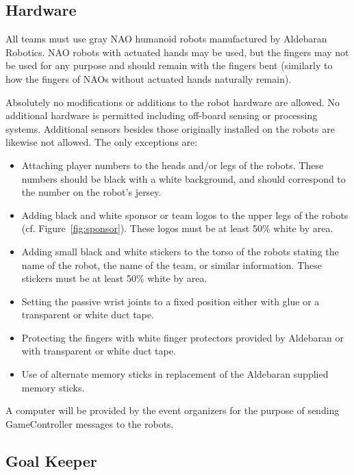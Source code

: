 \documentclass[12pt]{article}
\newcommand{\cf}{\mbox{cf.}\xspace}
\begin{document}
\subsection{Hardware}
\label{sec:hardware}
All teams must use gray NAO humanoid robots manufactured by Aldebaran Robotics. NAO robots with actuated hands may be used, but the fingers may not be used for any purpose and should remain with the fingers bent (similarly to how the fingers of NAOs without actuated hands naturally remain).

Absolutely no modifications or additions to the robot hardware are allowed. No additional hardware is permitted including off-board sensing or processing systems. Additional sensors besides those originally installed on the robots are likewise not allowed. The only exceptions are:

\begin{itemize}

\item Attaching player numbers to the heads and/or legs of the robots.  These numbers should be black with a white background, and should correspond to the number on the robot's jersey.

\item Adding black and white sponsor or team logos to the upper legs of the robots (\cf Figure~\ref{fig:sponsor}). These logos must be at least 50\% white by area.

\item Adding small black and white stickers to the torso of the robots stating the name of the robot, the name of the team, or similar information. These stickers must be at least 50\% white by area.

\item Setting the passive wrist joints to a fixed position either with glue or a transparent or white duct tape.

\item Protecting the fingers with white finger protectors provided by Aldebaran or with transparent or white duct tape.

\item Use of alternate memory sticks in replacement of the Aldebaran supplied memory sticks.

\end{itemize}

A computer will be provided by the event organizers for the purpose of sending GameController messages to the robots.

\subsection{Goal Keeper}
\label{sec:goal_keeper}
\end{document}
